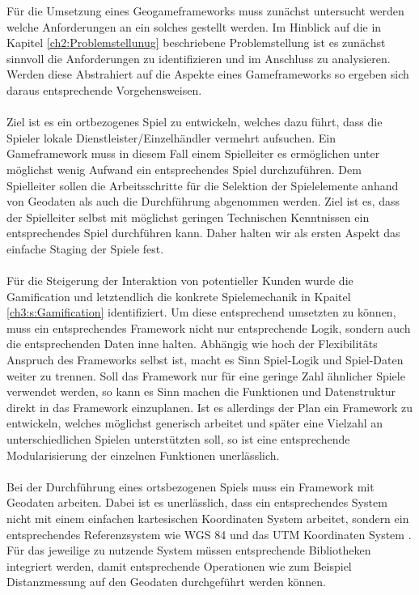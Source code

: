 Für die Umsetzung eines Geogameframeworks muss zunächst untersucht werden welche Anforderungen an ein solches gestellt werden.
Im Hinblick auf die in Kapitel \ref{ch2:Problemstellunug} beschriebene Problemstellung ist es zunächst sinnvoll die Anforderungen zu identifizieren und im Anschluss zu analysieren. Werden diese Abstrahiert auf die Aspekte eines Gameframeworks so ergeben sich daraus entsprechende Vorgehensweisen.
\\\\
Ziel ist es ein ortbezogenes Spiel zu entwickeln, welches dazu führt, dass die Spieler lokale Dienstleister/Einzelhändler vermehrt aufsuchen. Ein Gameframework muss in diesem Fall einem Spielleiter es ermöglichen unter möglichst wenig Aufwand ein entsprechendes Spiel durchzuführen.
Dem Spielleiter sollen die Arbeitsschritte für die Selektion der Spielelemente anhand von  Geodaten als auch die Durchführung abgenommen werden. Ziel ist es, dass der Spielleiter selbst mit möglichst geringen Technischen Kenntnissen ein entsprechendes Spiel durchführen kann. Daher halten wir als ersten Aspekt das einfache Staging der Spiele fest.
\\\\
Für die Steigerung der Interaktion von potentieller Kunden wurde die Gamification und letztendlich die konkrete Spielemechanik in Kpaitel \ref{ch3:s:Gamification} identifiziert. Um diese entsprechend umsetzten zu können, muss ein entsprechendes Framework nicht nur entsprechende Logik, sondern auch die entsprechenden Daten inne halten. Abhängig wie hoch der Flexibilitäts Anspruch des Frameworks selbst ist, macht es Sinn Spiel-Logik und Spiel-Daten weiter zu trennen. Soll das Framework nur für eine geringe Zahl ähnlicher Spiele verwendet werden, so kann es Sinn machen die Funktionen und Datenstruktur direkt in das Framework einzuplanen. Ist es allerdings der Plan ein Framework zu entwickeln, welches möglichst generisch arbeitet und später eine Vielzahl an unterschiedlichen Spielen unterstützten soll, so ist eine entsprechende Modularisierung der einzelnen Funktionen unerlässlich.
\\\\
Bei der Durchführung eines ortsbezogenen Spiels muss ein Framework mit Geodaten arbeiten.
Dabei ist es unerlässlich, dass ein entsprechendes System nicht mit einem einfachen kartesischen Koordinaten System arbeitet, sondern ein entsprechendes Referenzsystem wie WGS 84 \cite{Grafarend.1998} und das UTM Koordinaten System \cite{Grafarend.1995}.
Für das jeweilige zu nutzende System müssen entsprechende Bibliotheken integriert werden, damit entsprechende Operationen wie zum Beispiel Distanzmessung auf den Geodaten durchgeführt werden können.
